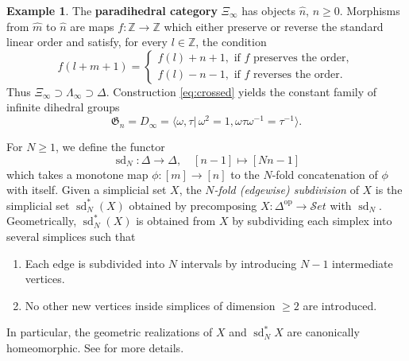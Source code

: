 \documentclass[english,11pt,leqno]{article}
\def\ZZ{\mathbb{Z}}
\def\Gen{\mathfrak{G}}
\def\on{\operatorname}
\def\lra{\longrightarrow}
\def\op{{\operatorname{op}}}
\def\Set{ {\mathcal Set}}
\def\Set{ {\mathcal Set}}
\theoremstyle{definition}
\newtheorem{exa}[thm]{Example}
\theoremstyle{remark}
\numberwithin{equation}{section}
\begin{document}
\begin{exa}\label{ex:para-dihedral} 
The {\bf paradihedral category} $\Xi_\infty$ has objects $\widehat n$, $n\geq 0$.
Morphisms from $\widehat m$ to $\widehat n$  are maps $f: \ZZ \to \ZZ$ which either preserve or reverse
	 the standard linear order and satisfy, for every $l \in \ZZ$, the condition 
	 \[
	 f(l +m+1) = \begin{cases} 
	 f(l) + n + 1, \text{ if $f$ preserves the order}, \\
	 f(l)-n-1,\text { if $f$ reverses the order}.
	 \end{cases}
	\]
	Thus $\Xi_\infty\supset \Lambda_\infty\supset\Delta$. 
	Construction \eqref{eq:crossed} yields the constant family
	of infinite dihedral groups 
	  \[
	 \Gen_n = D_{\infty} = \langle \omega, \tau |\, \omega ^2=1, \omega\tau\omega^{-1} = \tau^{-1}\rangle. 
	 \]	
\end{exa}

For $N\geq 1$, we define the functor
\[
\on{sd}_N: \Delta\lra\Delta, \quad [n-1] \mapsto [Nn-1]
\]
which takes a monotone map $\phi:[m] \to [n]$ to the $N$-fold concatenation of $\phi$ with itself.
Given a simplicial set $X$, the 
{\em $N$-fold (edgewise) subdivision} of $X$ is
the simplicial set $\on{sd}^*_N(X)$
obtained by precomposing $X:\Delta^\op\to\Set$ with $\on{sd}_N$.
Geometrically, $\on{sd}^*_N(X)$ is obtained from $X$ by subdividing each simplex into several simplices
such that
\begin{enumerate}
\item Each edge is subdivided into $N$ intervals by introducing $N-1$ intermediate vertices. 

\item No other new vertices  inside simplices of dimension $\geq 2$ are introduced.
\end{enumerate}
In particular, the geometric realizations of $X$ and $\on{sd}_N^*X$ are canonically homeomorphic.
See  \cite[\S 1]{bokstedt-et-al} \cite[E.6.4.3]{loday} for more details.
 
\end{document}
